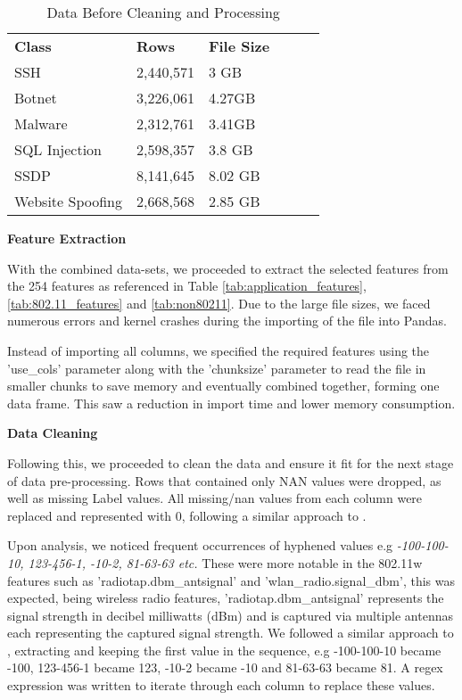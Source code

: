 \begin{table}[H]
\centering
\begin{tabular}{llllll}
\cline{1-3}
\textbf{Class}  & \textbf{Rows} & \textbf{File Size} &  &  &  \\ \cline{1-3}
SSH              & 2,440,571     & 3 GB               &  &  &  \\
Botnet           & 3,226,061     & 4.27GB             &  &  &  \\
Malware          & 2,312,761     & 3.41GB             &  &  &  \\
SQL Injection    & 2,598,357     & 3.8 GB             &  &  &  \\
SSDP             & 8,141,645     & 8.02 GB            &  &  &  \\
Website Spoofing & 2,668,568     & 2.85 GB            &  &  &  \\ \cline{1-3}
\end{tabular}
\caption{Data Before Cleaning and Processing}
\label{tab:full_data}
\end{table}

\medskip

\textbf{Feature Extraction}

\smallskip
With the combined data-sets, we proceeded to extract the selected features from the 254 features as referenced in Table \ref{tab:application_features}, \ref{tab:802.11_features} and \ref{tab:non80211}. Due to the large file sizes, we faced numerous errors and kernel crashes during the importing of the file into Pandas. 

Instead of importing all columns, we specified the required features using the 'use\_cols' parameter along with the 'chunksize' parameter to read the file in smaller chunks to save memory and eventually combined together, forming one data frame. This saw a reduction in import time and lower memory consumption.

\medskip
\textbf{Data Cleaning}

\smallskip
Following this, we proceeded to clean the data and ensure it fit for the next stage of data pre-processing. Rows that contained only NAN values were dropped, as well as missing Label values. All missing/nan values from each column were replaced and represented with 0, following a similar approach to \cite{s22155633}.

\smallskip
Upon analysis, we noticed frequent occurrences of hyphened values e.g \textit{-100-100-10, 123-456-1, -10-2, 81-63-63 etc.} These were more notable in the 802.11w features such as 'radiotap.dbm\_antsignal' and 'wlan\_radio.signal\_dbm', this was expected, being wireless radio features, 'radiotap.dbm\_antsignal' represents the signal strength in decibel milliwatts (dBm) and is captured via multiple antennas each representing the captured signal strength. We followed a similar approach to \cite{s22155633}, extracting and keeping the first value in the sequence, e.g -100-100-10 became -100, 123-456-1 became 123, -10-2 became -10 and 81-63-63 became 81. A regex expression was written to iterate through each column to replace these values. 

